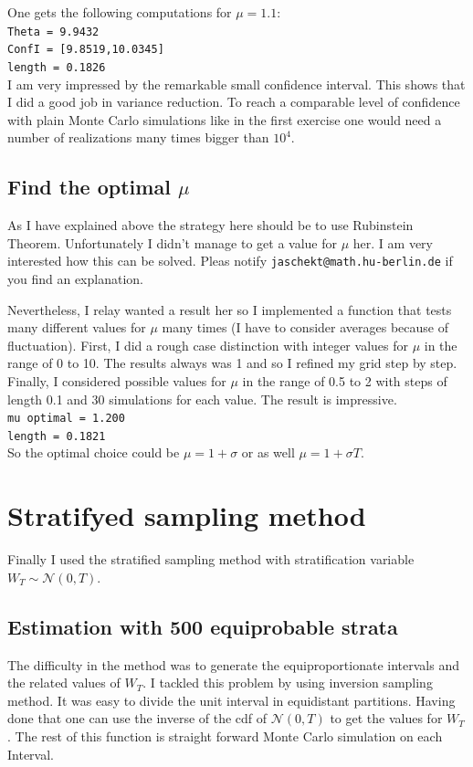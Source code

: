 \documentclass[12pt,a4paper]{scrartcl}
\begin{document}
\noindent One gets the following computations for $\mu = 1.1$:\\
\texttt{Theta = 9.9432}\\
\texttt{ConfI = [9.8519,10.0345]}\\
\texttt{length = 0.1826}  \\

\noindent I am very impressed by the remarkable small confidence interval. This shows that I did a good job in variance reduction. To reach a comparable level of confidence with plain Monte Carlo simulations like in the first exercise one would need a number of realizations many times bigger than $10^4$.

\subsection{Find the optimal $\mu$}
As I have explained above the strategy here should be to use Rubinstein Theorem. Unfortunately I didn't manage to get a value for $\mu$ her. I am very interested how this can be solved. Pleas notify \texttt{jaschekt@math.hu-berlin.de} if you find an explanation.

\noindent Nevertheless, I relay wanted a result her so I implemented a function that tests many different values for $\mu$ many times (I have to consider averages because of fluctuation). First, I did a rough case distinction with integer values for $\mu$ in the range of 0 to 10. The results always was  1 and so I refined my grid step by step. Finally, I considered possible values for $\mu$ in the range of 0.5 to 2 with steps of length 0.1 and 30 simulations for each value. The result is impressive.\\

\noindent \texttt{mu optimal = 1.200}\\
\texttt{length = 0.1821}\\

\noindent So the optimal choice could be $\mu = 1 + \sigma$ or as well $\mu = 1 + \sigma T$. 


\section{Stratifyed sampling method}
Finally I used the stratified sampling method with stratification variable $W_T \sim \mathcal{N}(0,T)$.
\subsection{Estimation with 500 equiprobable strata}
 The difficulty in the method was to generate the equiproportionate intervals and the related values of $W_T$. I tackled this problem by using inversion sampling method. It was easy to divide the unit interval in equidistant partitions. Having done that one can use the inverse of the cdf of $\mathcal{N}(0,T)$ to get the values for $W_T$.
The rest of this function is straight forward Monte Carlo simulation on each Interval.\\
\end{document}
